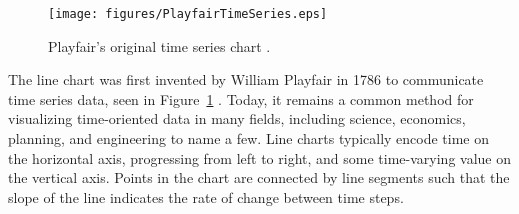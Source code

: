 \documentclass{article}
\begin{document}
\begin{figure}[h]
	\centering
	\texttt{[image: figures/PlayfairTimeSeries.eps]}
	\caption{Playfair's original time series chart \cite{playfair}.}
	\label{fig:playfair}
\end{figure}

The line chart was first invented by William Playfair in 1786 to communicate time series data, seen in Figure~\ref{fig:playfair} \cite{playfair}.  Today, it remains a common method for visualizing time-oriented data in many fields, including science, economics, planning, and engineering to name a few.  Line charts typically encode time on the horizontal axis, progressing from left to right, and some time-varying value on the vertical axis.  Points in the chart are connected by line segments such that the slope of the line indicates the rate of change between time steps.  %
\end{document}
